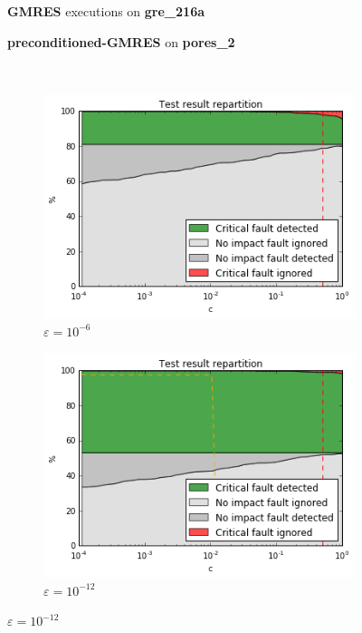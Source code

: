 \begin{figure}[h]
	\centering
    
\begin{minipage}[b]{0.45\linewidth}
\centering
\textbf{GMRES} executions on \textbf{gre_216a} 
\end{minipage}
\quad
\begin{minipage}{0.45\linewidth}
\centering
\textbf{preconditioned-GMRES} on \textbf{pores_2}
\end{minipage}\\


    \begin{minipage}[b]{0.48\linewidth}
	
	\begin{subfigure}[t]{\linewidth}
		\centering
		\includegraphics[width=1.1\linewidth]{figures/gre_216a/test_result_0.png}
		\caption{$\varepsilon = 10^{-6}$}\label{fig:gre_216a_test_result_0}	
	\end{subfigure}
    \quad
    \begin{subfigure}[t]{\linewidth}
		\centering
		\includegraphics[width=1.1\linewidth]{figures/gre_216a/test_result_1.png}
		\caption{$\varepsilon = 10^{-12}$}\label{fig:gre_216a_test_result_1}	
	\end{subfigure}
    \end{minipage}
    \quad
    \begin{minipage}[b]{0.48\linewidth}
    	

\end{minipage}
\end{figure}
